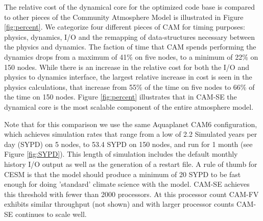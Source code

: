 \documentclass{agujournal}
\begin{document}
The relative cost of the dynamical core for the optimized code base is compared to other pieces of the Community Atmosphere Model is illustrated in Figure \ref{fig:percent}. We categorize four different pieces of CAM for timing purposes: physics, dynamics, I/O and the remapping of data-structures necessary between the physics and dynamics.  The faction of time that CAM spends performing the dynamics drops from a maximum of 41\% on five nodes, to a minimum of 22\% on 150 nodes.  While there is an increase in the relative cost for both the I/O and physics to dynamics interface, the largest relative increase in cost is seen in the physics calculations, that increase from 55\% of the time on five nodes to 66\% of the time on 150 nodes.  Figure \ref{fig:percent} illustrates that in CAM-SE the dynamical core is the most scalable component of the entire atmosphere model.  

Note that for this comparison we use the same Aquaplanet CAM6 configuration, which achieves simulation rates that range from a low of 2.2 Simulated years per day (SYPD) on 5 nodes, to 53.4 SYPD on 150 nodes, and run for 1 month (see Figure \ref{fig:SYPD}). This length of simulation includes the default monthly history I/O output as well as the generation of a restart file. A rule of thumb for CESM is that the model should produce a minimum of 20 SYPD to be fast enough for doing 'standard' climate science with the model. CAM-SE achieves this threshold with fewer than 2000 processors. At this processor count CAM-FV exhibits similar throughput (not shown) and with larger processor counts CAM-SE continues to scale well.
\end{document}
